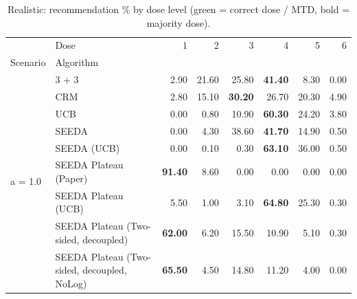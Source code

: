 \begin{table}[H]
\centering
\caption{Realistic: recommendation \% by dose level (green = correct dose / MTD, bold = majority dose).}
\label{tab:real_rec_by_dose}
\begin{tabular}{llrrrrrr}
\toprule
 & Dose & 1 & 2 & 3 & 4 & 5 & 6 \\
Scenario & Algorithm &  &  &  &  &  &  \\
\midrule
\multirow[c]{9}{*}{a = 1.0} & 3 + 3 & 2.90 & 21.60 & {\cellcolor[HTML]{C8E6C9}} 25.80 & \bfseries 41.40 & 8.30 & 0.00 \\
 & CRM & 2.80 & 15.10 & {\cellcolor[HTML]{C8E6C9}} \bfseries 30.20 & 26.70 & 20.30 & 4.90 \\
 & UCB & 0.00 & 0.80 & {\cellcolor[HTML]{C8E6C9}} 10.90 & \bfseries 60.30 & 24.20 & 3.80 \\
 & SEEDA & 0.00 & 4.30 & {\cellcolor[HTML]{C8E6C9}} 38.60 & \bfseries 41.70 & 14.90 & 0.50 \\
 & SEEDA (UCB) & 0.00 & 0.10 & {\cellcolor[HTML]{C8E6C9}} 0.30 & \bfseries 63.10 & 36.00 & 0.50 \\
 & SEEDA Plateau (Paper) & \bfseries 91.40 & 8.60 & {\cellcolor[HTML]{C8E6C9}} 0.00 & 0.00 & 0.00 & 0.00 \\
 & SEEDA Plateau (UCB) & 5.50 & 1.00 & {\cellcolor[HTML]{C8E6C9}} 3.10 & \bfseries 64.80 & 25.30 & 0.30 \\
 & SEEDA Plateau (Two-sided, decoupled) & \bfseries 62.00 & 6.20 & {\cellcolor[HTML]{C8E6C9}} 15.50 & 10.90 & 5.10 & 0.30 \\
 & SEEDA Plateau (Two-sided, decoupled, NoLog) & \bfseries 65.50 & 4.50 & {\cellcolor[HTML]{C8E6C9}} 14.80 & 11.20 & 4.00 & 0.00 \\
\bottomrule
\end{tabular}
\end{table}

